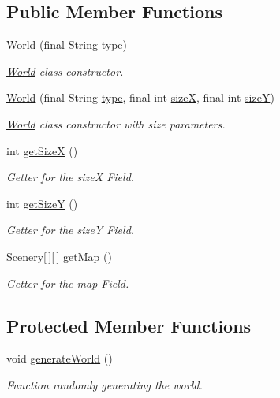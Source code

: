 \subsection*{Public Member Functions}
\begin{DoxyCompactItemize}
\item 
\hyperlink{classworld_1_1_world_afad8d3e3ce39f09fa0305fa412fc2080}{World} (final String \hyperlink{classworld_1_1_world_a008564127f7e69c09224a84ca7081893}{type})
\begin{DoxyCompactList}\small\item\em \hyperlink{classworld_1_1_world}{World} class constructor. \end{DoxyCompactList}\item 
\hyperlink{classworld_1_1_world_a59be3f314d90297f99652c9d45936425}{World} (final String \hyperlink{classworld_1_1_world_a008564127f7e69c09224a84ca7081893}{type}, final int \hyperlink{classworld_1_1_world_ab2ca92c9d2a56f6fa1872dc6cf0f4ab3}{size\-X}, final int \hyperlink{classworld_1_1_world_a3a110ad1276dc7dfa6bc47d9a663ec5e}{size\-Y})
\begin{DoxyCompactList}\small\item\em \hyperlink{classworld_1_1_world}{World} class constructor with size parameters. \end{DoxyCompactList}\item 
int \hyperlink{classworld_1_1_world_a2b90f767ed9a0227e1ba8733df76a73f}{get\-Size\-X} ()
\begin{DoxyCompactList}\small\item\em Getter for the size\-X Field. \end{DoxyCompactList}\item 
int \hyperlink{classworld_1_1_world_af74d811e8cc38adbb8a1e5a5cad9ac8d}{get\-Size\-Y} ()
\begin{DoxyCompactList}\small\item\em Getter for the size\-Y Field. \end{DoxyCompactList}\item 
\hyperlink{classworld_1_1scenery_1_1_scenery}{Scenery}\mbox{[}$\,$\mbox{]}\mbox{[}$\,$\mbox{]} \hyperlink{classworld_1_1_world_a44ad3a40dc799585961fbb489950f812}{get\-Map} ()
\begin{DoxyCompactList}\small\item\em Getter for the map Field. \end{DoxyCompactList}\end{DoxyCompactItemize}
\subsection*{Protected Member Functions}
\begin{DoxyCompactItemize}
\item 
void \hyperlink{classworld_1_1_world_aad82a66d1f2f8a7c8afa0483692754e8}{generate\-World} ()
\begin{DoxyCompactList}\small\item\em Function randomly generating the world. \end{DoxyCompactList}\end{DoxyCompactItemize}

